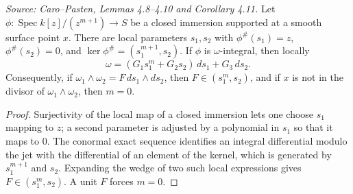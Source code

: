 \begin{lemma}
  \label{lem:cp_local_integral_expressions}
  \textit{Source: Caro--Pasten, Lemmas 4.8--4.10 and Corollary 4.11.}
  Let \(\phi:\operatorname{Spec}k[z]/(z^{m+1})\to S\) be a closed immersion
  supported at a smooth surface point \(x\).  There are local parameters
  \(s_1,s_2\) with \(\phi^\#(s_1)=z\), \(\phi^\#(s_2)=0\), and
  \(\ker\phi^\#=(s_1^{m+1},s_2)\).  If \(\phi\) is \(\omega\)-integral, then
  locally
  \[
    \omega=(G_1s_1^m+G_2s_2)\,ds_1+G_3\,ds_2.
  \]
  Consequently, if \(\omega_1\wedge\omega_2=F\,ds_1\wedge ds_2\), then
  \(F\in(s_1^m,s_2)\), and if \(x\) is not in the divisor of
  \(\omega_1\wedge\omega_2\), then \(m=0\).
\end{lemma}
\begin{proof}
  Surjectivity of the local map of a closed immersion lets one choose
  \(s_1\) mapping to \(z\); a second parameter is adjusted by a polynomial in
  \(s_1\) so that it maps to \(0\).  The conormal exact sequence identifies
  an integral differential modulo the jet with the differential of an element
  of the kernel, which is generated by \(s_1^{m+1}\) and \(s_2\).  Expanding
  the wedge of two such local expressions gives \(F\in(s_1^m,s_2)\).  A unit
  \(F\) forces \(m=0\).
\end{proof}

